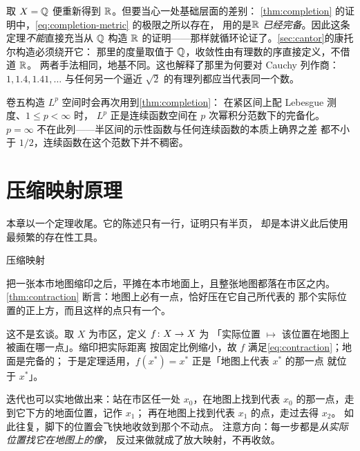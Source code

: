 \begin{remark}
  取 \(X = \mathbb{Q}\) 便重新得到 \(\mathbb{R}\)。但要当心一处基础层面的差别：
  \cref{thm:completion} 的证明中，\cref{eq:completion-metric} 的极限之所以存在，
  用的是\emph{\(\mathbb{R}\) 已经完备}。因此这条定理\emph{不能}直接充当从 \(\mathbb{Q}\)
  构造 \(\mathbb{R}\) 的证明——那样就循环论证了。\cref{sec:cantor}的康托尔构造必须绕开它：
  那里的度量取值于 \(\mathbb{Q}\)，收敛性由有理数的序直接定义，不借道 \(\mathbb{R}\)。
  两者手法相同，地基不同。这也解释了那里为何要对 Cauchy 列作商：
  \(1, 1.4, 1.41, \dots\) 与任何另一个逼近 \(\sqrt{2}\) 的有理列都应当代表同一个数。

  卷五构造 \(L^{p}\) 空间时会再次用到\cref{thm:completion}：
  在紧区间上配 Lebesgue 测度、\(1 \le p < \infty\) 时，
  \(L^{p}\) 正是连续函数空间在 \(p\) 次幂积分范数下的完备化。
  \(p=\infty\) 不在此列——半区间的示性函数与任何连续函数的本质上确界之差
  都不小于 \(1/2\)，连续函数在这个范数下并不稠密。
\end{remark}

\section{压缩映射原理}
\label{sec:contraction}

本章以一个定理收尾。它的陈述只有一行，证明只有半页，
却是本讲义此后使用最频繁的存在性工具。

\begin{concept}{压缩映射}
\end{concept}

\begin{intuition}
  把一张本市地图缩印之后，平摊在本市地面上，且整张地图都落在市区之内。
  \cref{thm:contraction} 断言：地图上必有一点，恰好压在它自己所代表的
  那个实际位置的正上方，而且这样的点只有一个。

  这不是玄谈。取 \(X\) 为市区，定义 \(f \colon X \to X\) 为
  「实际位置 \(\mapsto\) 该位置在地图上被画在哪一点」。缩印把实际距离
  按固定比例缩小，故 \(f\) 满足\cref{eq:contraction}；地面是完备的；
  于是定理适用，\(f(x^{*})=x^{*}\) 正是「地图上代表 \(x^{*}\) 的那一点
  就位于 \(x^{*}\)」。

  迭代也可以实地做出来：站在市区任一处 \(x_{0}\)，在地图上找到代表
  \(x_{0}\) 的那一点，走到它下方的地面位置，记作 \(x_{1}\)；
  再在地图上找到代表 \(x_{1}\) 的点，走过去得 \(x_{2}\)。
  如此往复，脚下的位置会飞快地收敛到那个不动点。
  注意方向：每一步都是\emph{从实际位置找它在地图上的像}，
  反过来做就成了放大映射，不再收敛。
\end{intuition}

